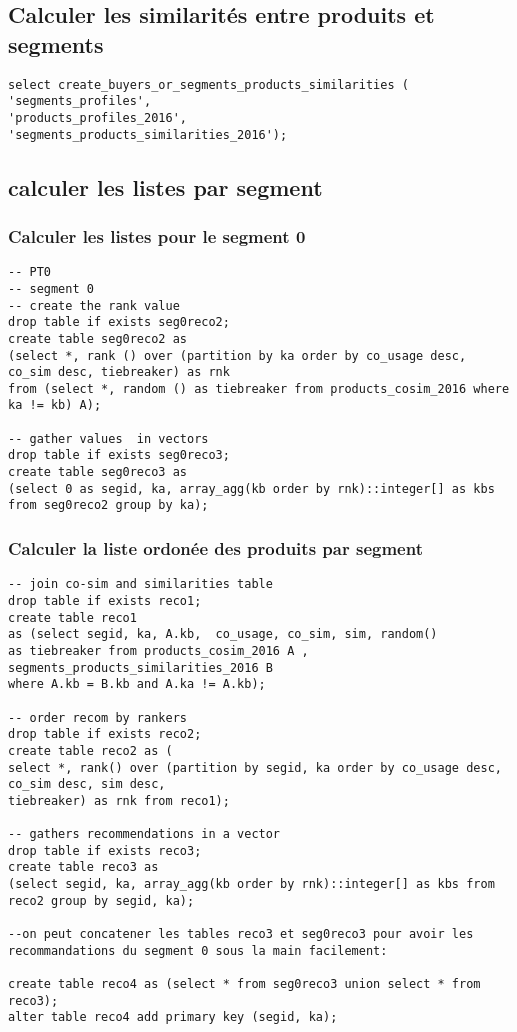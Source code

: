 \documentclass[a4paper,11pt]{article}
\begin{document}
\subsection{Calculer les similarités entre produits et segments}
\begin{verbatim}
select create_buyers_or_segments_products_similarities (
'segments_profiles', 
'products_profiles_2016', 
'segments_products_similarities_2016');
\end{verbatim}

\subsection{calculer les listes par segment}
\subsubsection{Calculer les listes pour le segment 0}
\begin{verbatim}
-- PT0
-- segment 0
-- create the rank value
drop table if exists seg0reco2;
create table seg0reco2 as
(select *, rank () over (partition by ka order by co_usage desc, co_sim desc, tiebreaker) as rnk
from (select *, random () as tiebreaker from products_cosim_2016 where ka != kb) A);

-- gather values  in vectors
drop table if exists seg0reco3;
create table seg0reco3 as
(select 0 as segid, ka, array_agg(kb order by rnk)::integer[] as kbs from seg0reco2 group by ka);
\end{verbatim}

\subsubsection{Calculer la liste ordonée des produits par segment}
\begin{verbatim}
-- join co-sim and similarities table
drop table if exists reco1;
create table reco1
as (select segid, ka, A.kb,  co_usage, co_sim, sim, random()
as tiebreaker from products_cosim_2016 A , segments_products_similarities_2016 B 
where A.kb = B.kb and A.ka != A.kb);

-- order recom by rankers
drop table if exists reco2;
create table reco2 as (
select *, rank() over (partition by segid, ka order by co_usage desc, co_sim desc, sim desc, 
tiebreaker) as rnk from reco1);

-- gathers recommendations in a vector
drop table if exists reco3;
create table reco3 as 
(select segid, ka, array_agg(kb order by rnk)::integer[] as kbs from reco2 group by segid, ka);

--on peut concatener les tables reco3 et seg0reco3 pour avoir les recommandations du segment 0 sous la main facilement:

create table reco4 as (select * from seg0reco3 union select * from reco3);
alter table reco4 add primary key (segid, ka);


\end{verbatim}
\end{document}
